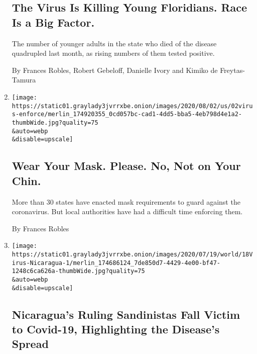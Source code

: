 \begin{enumerate}
  \hypertarget{the-virus-is-killing-young-floridians-race-is-a-big-factor}{%
  \subsection{The Virus Is Killing Young Floridians. Race Is a Big
  Factor.}\label{the-virus-is-killing-young-floridians-race-is-a-big-factor}}

  The number of younger adults in the state who died of the disease
  quadrupled last month, as rising numbers of them tested positive.

  By Frances Robles, Robert Gebeloff, Danielle Ivory and Kimiko de
  Freytas-Tamura
\item
  \href{/2020/07/31/us/coronavirus-masks-enforcement-key-west.html}{}

  \texttt{[image: https://static01.graylady3jvrrxbe.onion/images/2020/08/02/us/02virus-enforce/merlin\_174920355\_0cd057bc-cad1-4dd5-bba5-4eb798d4e1a2-thumbWide.jpg?quality=75\\\&auto=webp\\\&disable=upscale]}

  \hypertarget{wear-your-mask-please-no-not-on-your-chin}{%
  \subsection{Wear Your Mask. Please. No, Not on Your
  Chin.}\label{wear-your-mask-please-no-not-on-your-chin}}

  More than 30 states have enacted mask requirements to guard against
  the coronavirus. But local authorities have had a difficult time
  enforcing them.

  By Frances Robles
\item
  \href{/2020/07/18/world/americas/coronavirus-nicaragua-sandinistas.html}{}

  \texttt{[image: https://static01.graylady3jvrrxbe.onion/images/2020/07/19/world/18Virus-Nicaragua-1/merlin\_174686124\_7de850d7-4429-4e00-bf47-1248c6ca626a-thumbWide.jpg?quality=75\\\&auto=webp\\\&disable=upscale]}

  \hypertarget{nicaraguas-ruling-sandinistas-fall-victim-to-covid-19-highlighting-the-diseases-spread}{%
  \subsection{Nicaragua's Ruling Sandinistas Fall Victim to Covid-19,
  Highlighting the Disease's
  Spread}\label{nicaraguas-ruling-sandinistas-fall-victim-to-covid-19-highlighting-the-diseases-spread}}


\end{enumerate}

